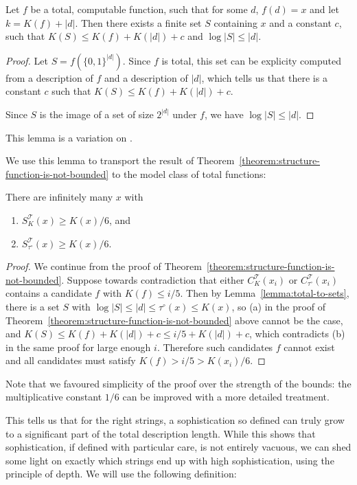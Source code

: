 \documentclass{style/llncs}
\newcommand{\T}{\mathscr T}
\begin{document}
\begin{lemma}
Let $f$ be a total, computable function, such that for some $d$, $f(d) = x$ and let $k = K(f) + |d|$. Then there exists a finite set $S$ containing $x$ and a constant $c$, such that $K(S) \leq K(f) + K(|d|) + c$ and $\log |S| \leq |d|$.\label{lemma:total-to-sets}
\end{lemma}
\begin{proof}
Let $S = f\left(\{0,1\}^{|d|}\right)$. Since $f$ is total, this set can be explicity computed from a description of $f$ and a description of $|d|$, which tells us that there is a constant $c$ such that $K(S) \leq K(f) + K(|d|) + c$. 

Since $S$ is the image of a set of size $2^{|d|}$ under $f$, we have $\log |S| \leq |d|$.
\end{proof}
This lemma is a variation on \cite[Lemma~7.2]{vitanyi2004meaningful}.

We use this lemma to transport the result of Theorem~\ref{theorem:structure-function-is-not-bounded} to the model class of total functions:

\begin{theorem}
There are infinitely many $x$ with 
\begin{enumerate}
  \item $S^\T_K(x) \geq K(x)/6$, {and}\label{eq:poezenvoer}
  \item $S^\T_{\tau^\circ}(x) \geq K(x)/6$. \label{eq:hondevoer}
\end{enumerate}
\end{theorem}
\begin{proof}
We continue from the proof of Theorem~\ref{theorem:structure-function-is-not-bounded}. Suppose towards contradiction that either $C^\T_K(x_i)$ or $C^\T_{\tau^\circ}(x_i)$ contains a candidate $f$ with $K(f)\le i/5$. Then by Lemma~\ref{lemma:total-to-sets}, there is a set $S$ with $\log|S|\le|d|\le\tau^\circ(x)\le K(x)$, so (a) in the proof of Theorem~\ref{theorem:structure-function-is-not-bounded} above cannot be the case, and $K(S)\le K(f)+K(|d|)+c\le i/5+K(|d|)+c$, which contradicts (b) in the same proof for large enough $i$. Therefore such candidates $f$ cannot exist and all candidates must satisfy $K(f)>i/5>K(x_i)/6$.
\end{proof}
Note that we favoured simplicity of the proof over the strength of the bounds: the multiplicative constant $1/6$ can be improved with a more detailed treatment.

This tells us that for the right strings, a sophistication so defined can truly grow to a significant part of the total description length. While this shows that sophistication, if defined with particular care, is not entirely vacuous, we can shed some light on exactly which strings end up with high sophistication, using the principle of depth. We will use the following definition:
\end{document}
